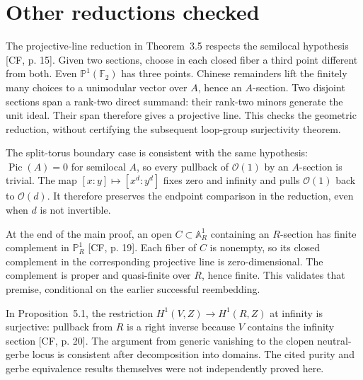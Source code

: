 \documentclass[10pt]{article}
\begin{document}
\section*{Other reductions checked}
The projective-line reduction in Theorem 3.5 respects the semilocal hypothesis [CF, p. 15]. Given two sections, choose in each closed fiber a third point different from both. Even \(\mathbb P^1(\mathbb F_2)\) has three points. Chinese remainders lift the finitely many choices to a unimodular vector over \(A\), hence an \(A\)-section. Two disjoint sections span a rank-two direct summand: their rank-two minors generate the unit ideal. Their span therefore gives a projective line. This checks the geometric reduction, without certifying the subsequent loop-group surjectivity theorem.\par
The split-torus boundary case is consistent with the same hypothesis: \(\mathop{\mathrm{Pic}}(A)=0\) for semilocal \(A\), so every pullback of \(\mathcal O(1)\) by an \(A\)-section is trivial. The map \([x:y]\mapsto[x^d:y^d]\) fixes zero and infinity and pulls \(\mathcal O(1)\) back to \(\mathcal O(d)\). It therefore preserves the endpoint comparison in the reduction, even when \(d\) is not invertible.\par
At the end of the main proof, an open \(C\subset\mathbb A_R^1\) containing an \(R\)-section has finite complement in \(\mathbb P_R^1\) [CF, p. 19]. Each fiber of \(C\) is nonempty, so its closed complement in the corresponding projective line is zero-dimensional. The complement is proper and quasi-finite over \(R\), hence finite. This validates that premise, conditional on the earlier successful reembedding.\par
In Proposition 5.1, the restriction \(H^1(V,Z)\to H^1(R,Z)\) at infinity is surjective: pullback from \(R\) is a right inverse because \(V\) contains the infinity section [CF, p. 20]. The argument from generic vanishing to the clopen neutral-gerbe locus is consistent after decomposition into domains. The cited purity and gerbe equivalence results themselves were not independently proved here.\par
\end{document}
